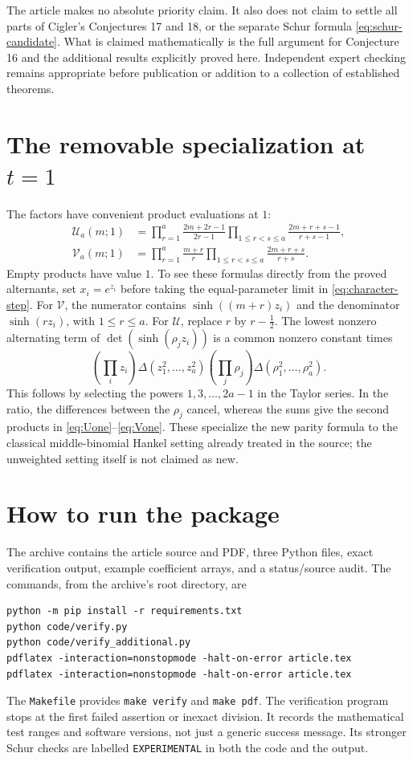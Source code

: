 \documentclass[11pt]{article}
\theoremstyle{definition}
\theoremstyle{remark}
\newcommand{\U}{\mathcal U}
\newcommand{\V}{\mathcal V}
\newcommand{\Dlt}{\Delta}
\numberwithin{equation}{section}
\begin{document}
The article makes no absolute priority claim. It also does not claim to
settle all parts of Cigler's Conjectures 17 and 18, or the separate Schur
formula \eqref{eq:schur-candidate}. What is claimed mathematically is the
full argument for Conjecture 16 and the additional results explicitly
proved here. Independent expert checking remains appropriate before
publication or addition to a collection of established theorems.

\appendix
\section{The removable specialization at \texorpdfstring{$t=1$}{t=1}}
\label{app:one}

The factors have convenient product evaluations at $1$:
\begin{align}
 \U_a(m;1)&=
 \prod_{r=1}^a\frac{2m+2r-1}{2r-1}
 \prod_{1\le r<s\le a}\frac{2m+r+s-1}{r+s-1},\label{eq:Uone}\\
 \V_a(m;1)&=
 \prod_{r=1}^a\frac{m+r}{r}
 \prod_{1\le r<s\le a}\frac{2m+r+s}{r+s}.
 \label{eq:Vone}
\end{align}
Empty products have value $1$.
To see these formulas directly from the proved alternants, set
$x_i=e^{z_i}$ before taking the equal-parameter limit in
\eqref{eq:character-step}. For $\V$, the numerator contains
$\sinh((m+r)z_i)$ and the denominator $\sinh(rz_i)$, with $1\le r\le a$.
For $\U$, replace $r$ by $r-\tfrac12$.
The lowest nonzero alternating term of
$\det(\sinh(\rho_j z_i))$ is a common nonzero constant times
\[
 \left(\prod_i z_i\right)\Dlt(z_1^2,\ldots,z_a^2)
 \left(\prod_j\rho_j\right)\Dlt(\rho_1^2,\ldots,\rho_a^2).
\]
This follows by selecting the powers $1,3,\ldots,2a-1$ in the Taylor
series. In the ratio, the differences between the $\rho_j$ cancel,
whereas the sums give the second products in
\eqref{eq:Uone}--\eqref{eq:Vone}. These specialize the new parity formula
to the classical middle-binomial Hankel setting already treated in the
source; the unweighted setting itself is not claimed as new.

\clearpage
\section{How to run the package}

The archive contains the article source and PDF, three Python files, exact
verification output, example coefficient arrays, and a status/source audit.
The commands, from the archive's root directory, are
\begin{verbatim}
python -m pip install -r requirements.txt
python code/verify.py
python code/verify_additional.py
pdflatex -interaction=nonstopmode -halt-on-error article.tex
pdflatex -interaction=nonstopmode -halt-on-error article.tex
\end{verbatim}
The \texttt{Makefile} provides \texttt{make verify} and \texttt{make pdf}.
The verification program stops at the first failed assertion or inexact
division. It records the mathematical test ranges and software versions,
not just a generic success message. Its stronger Schur checks are labelled
\texttt{EXPERIMENTAL} in both the code and the output.
\end{document}
